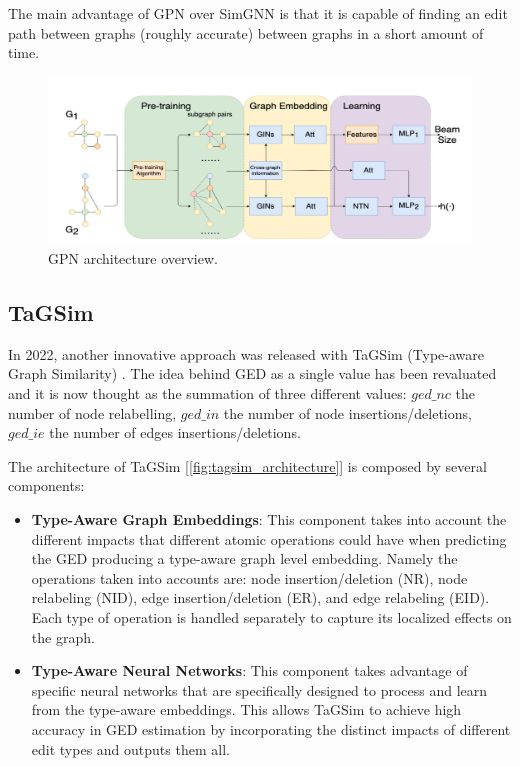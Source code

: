 \documentclass[../Thesis.tex]{subfiles}
\begin{document}
	The main advantage of GPN over SimGNN is that it is capable of finding an edit path between graphs (roughly accurate) between graphs in a short amount of time.
	
	\begin{figure}[H]
		\centering
		\includegraphics[width=\textwidth]{Images/gpn_architecture.png}
		\caption{GPN architecture overview.}
		\label{fig:gpn_architecture}
	\end{figure}
	
	
	\subsection{TaGSim}
	
	In 2022, another innovative approach was released with TaGSim (Type-aware Graph Similarity) \cite{TaGSim_type_aware_graph_similarity_learning_and_computation}. The idea behind GED as a single value has been revaluated and it is now thought as the summation of three different values: $ged\_nc$ the number of node relabelling, $ged\_in$ the number of node insertions/deletions, $ged\_ie$ the number of edges insertions/deletions. 
	
	The architecture of TaGSim [\autoref{fig:tagsim_architecture}] is composed by several components:
	
	\begin{itemize}
		\item \textbf{Type-Aware Graph Embeddings}: This component takes into account the different impacts that different atomic operations could have when predicting the GED producing a type-aware graph level embedding. Namely the operations taken into accounts are: node insertion/deletion (NR), node relabeling (NID), edge insertion/deletion (ER), and edge relabeling (EID). Each type of operation is handled separately to capture its localized effects on the graph.
		\item \textbf{Type-Aware Neural Networks}: This component takes advantage of specific neural networks that are specifically designed to process and learn from the type-aware embeddings. This allows TaGSim to achieve high accuracy in GED estimation by incorporating the distinct impacts of different edit types and outputs them all.
	\end{itemize}
	
\end{document}
